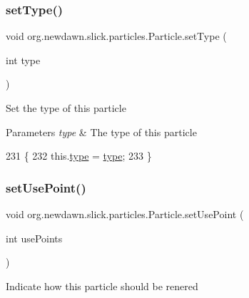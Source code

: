 \subsubsection{\texorpdfstring{set\+Type()}{setType()}}
{\footnotesize\ttfamily void org.\+newdawn.\+slick.\+particles.\+Particle.\+set\+Type (\begin{DoxyParamCaption}\item[{int}]{type }\end{DoxyParamCaption})\hspace{0.3cm}{\ttfamily [inline]}}

Set the type of this particle


\begin{DoxyParams}{Parameters}
{\em type} & The type of this particle \\
\hline
\end{DoxyParams}

\begin{DoxyCode}
231                                   \{
232         this.\mbox{\hyperlink{classorg_1_1newdawn_1_1slick_1_1particles_1_1_particle_a8c228f79bbcb3a100f9b03ca98e29602}{type}} = \mbox{\hyperlink{classorg_1_1newdawn_1_1slick_1_1particles_1_1_particle_a8c228f79bbcb3a100f9b03ca98e29602}{type}};
233     \}
\end{DoxyCode}
\mbox{\label{classorg_1_1newdawn_1_1slick_1_1particles_1_1_particle_add995f084a37e63cb80af65b04cbcdc8}} 
\subsubsection{\texorpdfstring{set\+Use\+Point()}{setUsePoint()}}
{\footnotesize\ttfamily void org.\+newdawn.\+slick.\+particles.\+Particle.\+set\+Use\+Point (\begin{DoxyParamCaption}\item[{int}]{use\+Points }\end{DoxyParamCaption})\hspace{0.3cm}{\ttfamily [inline]}}

Indicate how this particle should be renered


